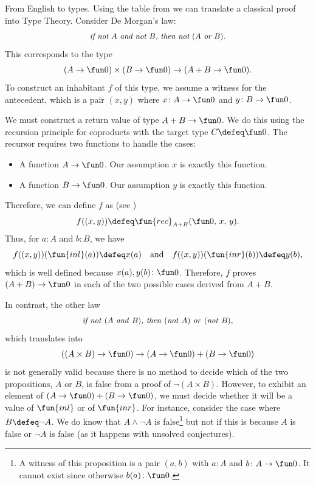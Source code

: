 \begin{lpar}{From English to types.}
    Using the table from  we can translate a classical proof into Type Theory. Consider De Morgan's law:
    \[
        \textit{\small if not $A$ and not $B$, then not $(A$ or $B)$.}
    \]
    This corresponds to the type
    \[
        (A\to\fun0)\times(B\to\fun0)\to (A+B\to\fun0).
    \]
    To construct an inhabitant $f$ of this type, we assume a witness for the antecedent, which is a pair $(x,y)$ where $x\colon A\to\fun0$ and $y\colon B\to\fun0$. 

    We must construct a return value of type $A+B \to \fun0$. We do this using the recursion principle for coproducts with the target type $C\defeq\fun0$.
    The recursor requires two functions to handle the cases:
    \begin{itemize}
        \item A function $A \to \fun0$. Our assumption $x$ is exactly this function.
        \item A function $B \to \fun0$. Our assumption $y$ is exactly this function.
    \end{itemize}
    Therefore, we can define $f$ as (see )
    \[
        f((x,y))\defeq \fun{rec}_{A+B}(\fun0,\, x,\, y).
    \]
    Thus, for $a\colon A$ and $b\colon B$, we have 
    \[
        f((x,y))(\fun{inl}(a))\defeq x(a)
        \quad\text{and}\quad
        f((x,y))(\fun{inr}(b))\defeq y(b),
    \]
    which is well defined because $x(a),y(b)\colon\fun0$. Therefore, $f$ proves $(A+B)\to\fun0$ in each of the two possible cases derived from $A+B$.

    In contrast, the other law
    \[
        \textit{\small if not\/ $(A$ and\/ $B)$,
            then\/ $($not\/ $A)$ or\/ $($not\/ $B)$},
    \]
    which translates into
    \[
        ((A\times B)\to\fun0)\to(A\to\fun0)+(B\to\fun0)
    \]
    is not generally valid because there is no method to decide which of the two propositions, $A$ or $B$, is false from a proof of $\neg(A\times B)$. However, to exhibit an element of $(A\to\fun0)+(B\to\fun0)$, we must decide whether it will be a value of $\fun{inl}$ or of $\fun{inr}$. For instance, consider the case where $B\defeq\neg A$. We do know that $A\wedge\neg A$ is false\footnote{A witness of this proposition is a pair $(a,b)$ with $a\colon A$ and $b\colon A\to\fun0$. It cannot exist since otherwise $b(a)\colon\fun0$.} but not if this is because $A$ is false or $\neg A$ is false (as it happens with unsolved conjectures).
\end{lpar}

